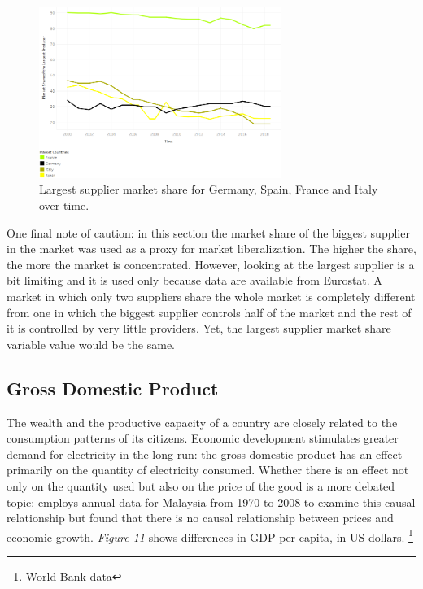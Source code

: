 \documentclass{book}
\begin{document}
\bigskip
\begin{figure}[H]
\begin{center}
\captionsetup{justification=centering}
\includegraphics[width=0.7\textwidth]{Images/conc-mc.png}
\caption{Largest supplier market share for Germany, Spain, France and Italy over time. }
\end{center}
\end{figure}
\bigskip

One final note of caution: in this section the market share of the biggest supplier in the market was used as a proxy for market liberalization. The higher the share, the more the market is concentrated. However, looking at the largest supplier is a bit limiting and it is used only because data are available from Eurostat. A market in which only two suppliers share the whole market is completely different from one in which the biggest supplier controls half of the market and the rest of it is controlled by very little providers. Yet, the largest supplier market share variable value would be the same.

\subsection*{Gross Domestic Product}

The wealth and the productive capacity of a country are closely related to the consumption patterns of its citizens. Economic development stimulates greater demand for electricity in the long-run: the gross domestic product has an effect primarily on the quantity of electricity consumed. \cite{jamil2010relationship} Whether there is an effect not only on the quantity used but also on the price of the good is a more debated topic: \cite{lean2010multivariate} employs annual data for Malaysia from 1970 to 2008 to examine this causal relationship but found that there is no causal relationship between prices and economic growth. \textit{Figure 11} shows differences in GDP per capita, in US dollars. \footnote{World Bank data}
\end{document}
